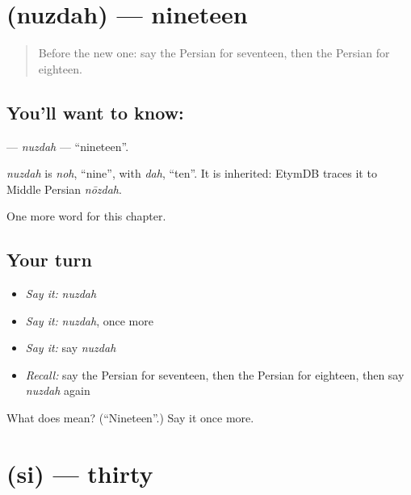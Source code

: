 \section[\texorpdfstring{\fa{نوزده} (nuzdah)}{نوزده (nuzdah)}]{ (nuzdah) — nineteen}

\label{lesson:FA-C76-nuzdah}



\begin{quote}
Before the new one: say the Persian for seventeen, then the Persian for eighteen.
\end{quote}

\subsection*{You'll want to know: }
\textbf{} — \emph{nuzdah} — \textquotedblleft{}nineteen\textquotedblright{}.

\begin{cousinweb}
\emph{nuzdah} is \emph{noh}, \textquotedblleft{}nine\textquotedblright{}, with \emph{dah}, \textquotedblleft{}ten\textquotedblright{}. It is inherited: EtymDB traces it to Middle Persian \emph{nōzdah}.
\end{cousinweb}

\begin{grammarlens}[title={What you've built}]
One more word for this chapter.
\end{grammarlens}

\subsection*{Your turn}
\begin{itemize}
\raggedright
  \item \emph{Say it:} \emph{nuzdah}
  \item \emph{Say it:} \emph{nuzdah}, once more
  \item \emph{Say it:} say \emph{nuzdah}
  \item \emph{Recall:} say the Persian for seventeen, then the Persian for eighteen, then say \emph{nuzdah} again
\end{itemize}

\begin{tcolorbox}[breakable,colback=teal!4,colframe=teal!35!black,title={Before you move on}]
What does  mean? (\textquotedblleft{}Nineteen\textquotedblright{}.) Say it once more.
\end{tcolorbox}
\section[\texorpdfstring{\fa{سی} (si)}{سی (si)}]{ (si) — thirty}

